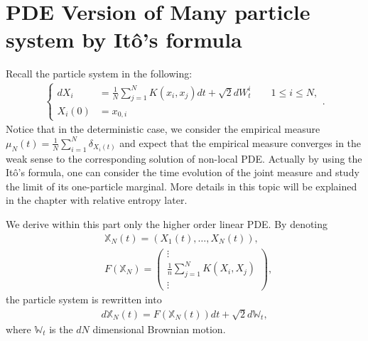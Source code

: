 \section{PDE Version of Many particle system by It\^o's formula}
Recall the particle system in the following:
\begin{align*}
  \begin{cases}  
  d X_i &=  \frac{1}{N} \sum_{j=1}^N K(x_i,x_j) dt + \sqrt{2} dW_t^i  \qquad 1\le i\le N ,\\
  X_i(0)    &= x_{0,i}   
  \end{cases}
.\end{align*}
Notice that in the deterministic case, we consider the empirical measure $\mu_N(t) = \frac{1}{N} \sum_{i=1}^{N} \delta_{X_i(t)} $ and expect that the empirical measure converges in the weak sense to the corresponding solution of non-local PDE. Actually by using the It\^o's formula, one can consider the time evolution of the joint measure and study the limit of its one-particle marginal. More details in this topic will be explained in the chapter with relative entropy later. 

We derive within this part only the higher order linear PDE.
By denoting  
\begin{align*}
&\mathbb{X}_N(t)= (X_{1}(t),\ldots ,X_N(t)),\\
&F(\mathbb{X}_N)=\begin{pmatrix} \vdots \\ \frac{1}{n} \sum_{j=1}^{N} K(X_i,X_j) \\ \vdots  \end{pmatrix},
\end{align*}
the particle system is rewritten into
\begin{align*}
  d\mathbb{X}_N(t) = F(\mathbb{X}_N(t)) dt + \sqrt{2}d\mathbb{W}_{t},
\end{align*}
where $\mathbb{W}_t$ is the $dN$ dimensional Brownian motion.

